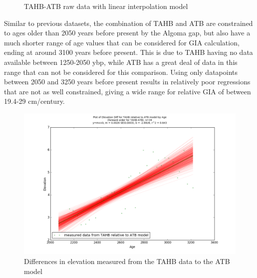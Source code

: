 \begin{figure}[h]
	\caption{TAHB-ATB raw data with linear interpolation model}
	\label{fig:data_TAHBxATB}
\end{figure}

Similar to previous datasets, the combination of TAHB and ATB are constrained to
ages older than
2050 years before present by the Algoma gap, but also have a much shorter range
of age values that
can be considered for GIA calculation, ending at around 3100 years before present.
This is due to TAHB having no data available between 1250-2050 ybp, while ATB
has a great deal of data in this range that can not be considered for this
comparison.
Using only datapoints between 2050 and 3250 years before present results in
relatively poor regressions that are not as well constrained, giving a wide range for
relative GIA of between 19.4-29 cm/century.

\newpage

\begin{figure}[h]
	\includegraphics[width=0.9\linewidth]{data/bothNonZero/withinSeventyFivePercent/gias/theGIA_TAHB_relative_to_ATB.png}
	\caption{Differences in elevation measured from the TAHB data to the ATB model}
	\label{fig:gias_TAHBxATB}
\end{figure}
\newpage


